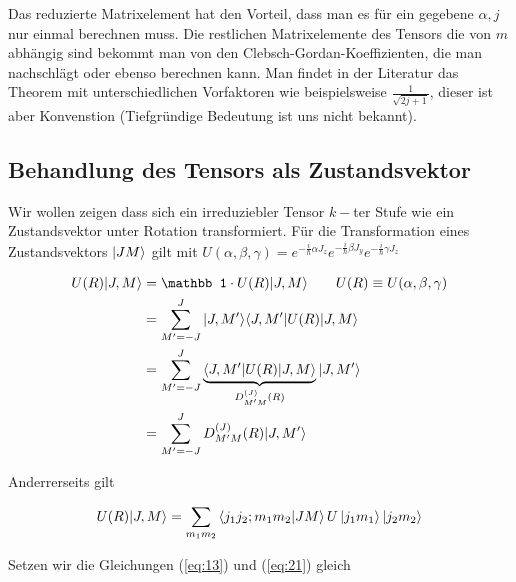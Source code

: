 Das reduzierte Matrixelement hat den Vorteil, dass man es für ein gegebene \(\alpha,j\) nur einmal berechnen muss. Die restlichen Matrixelemente des Tensors die von \(m\) abhängig sind bekommt man von den Clebsch-Gordan-Koeffizienten, die man nachschlägt oder ebenso berechnen kann. Man findet in der Literatur das Theorem mit unterschiedlichen Vorfaktoren wie beispielsweise \(\frac{1}{\sqrt{2j+1}}\), dieser ist aber Konvenstion (Tiefgründige Bedeutung ist uns nicht bekannt).


\subsection*{Behandlung des Tensors als Zustandsvektor}
\label{sec:1}

Wir wollen zeigen dass sich ein irreduziebler Tensor \(k-\)ter Stufe wie ein Zustandsvektor unter Rotation transformiert. Für die Transformation eines Zustandsvektors \(\left| JM \right\rangle\) gilt mit \( U(\alpha, \beta,\gamma) = e^{-\frac{i}{\hbar}\alpha J_z}  e^{-\frac{i}{\hbar}\beta J_y} e^{-\frac{i}{\hbar}\gamma J_z}\)

\begin{align} 
\label{eq:13}
U(R)|J,M\rangle &= \mathbb 1 \cdot U(R)|J,M\rangle \qquad U(R)\equiv U(\alpha, \beta,\gamma)\notag \\
&= \sum_{M'=-J}^J |J,M'\rangle\langle J,M'| U(R)|J,M\rangle \notag \\
&= \sum_{M'=-J}^J \underbr{ \langle J,M'|  U(R)|J,M\rangle}_{D^{(J)}_{M'M}(R)} |J,M'\rangle \\
&= \sum_{M'=-J}^J D^{(J)}_{M'M}(R) |J,M'\rangle \notag
\end{align}

Anderrerseits gilt

\begin{equation}
  \label{eq:21}
  U(R)|J,M\rangle = \sum_{m_1 m_2} \braket{j_1j_2;m_1m_2}{JM}U\ket{j_1m_1}\ket{j_2m_2}
\end{equation}

Setzen wir die Gleichungen (\ref{eq:13})  und (\ref{eq:21}) gleich


